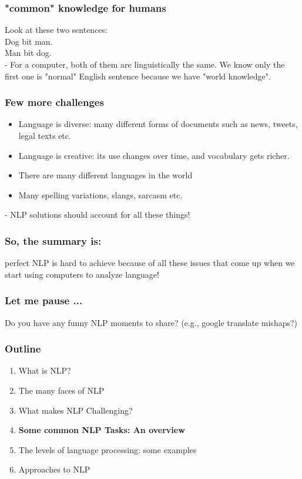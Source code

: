 \documentclass{beamer}
\begin{document}
\begin{frame}
\frametitle{"common" knowledge for humans}
Look at these two sentences:
\\ Dog bit man.
\\ Man bit dog.
\\ - For a computer, both of them are linguistically the same. We know only the first one is "normal" English sentence because we have "world knowledge".
\end{frame}

\begin{frame}
\frametitle{Few more challenges}
\begin{itemize}
\item Language is diverse: many different forms of documents such as news, tweets, legal texts etc.
\item Language is creative: its use changes over time, and vocabulary gets richer. 
\item There are many different languages in the world
\item Many spelling variations, slangs, sarcasm etc.
\end{itemize}
- NLP solutions should account for all these things!
\end{frame}

\begin{frame}
\frametitle{So, the summary is:}
perfect NLP is hard to achieve because of all these issues that come up when we start using computers to analyze language!
\end{frame}

\begin{frame}
\frametitle{Let me pause ...} 
Do you have any funny NLP moments to share? (e.g., google translate mishaps?)
\end{frame}

\begin{frame}
\frametitle{Outline}
\begin{enumerate}
    \item What is NLP?
    \item The many faces of NLP
    \item What makes NLP Challenging?
    \item \textbf{Some common NLP Tasks: An overview}
    \item The levels of language processing: some examples
    \item Approaches to NLP
\end{enumerate}
\end{frame}
\end{document}
